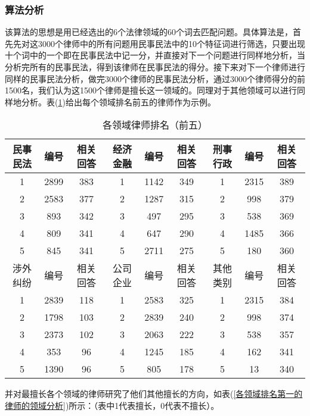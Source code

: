\documentclass[bwprint]{cumcmthesis}
\begin{document}
\subsubsection{算法分析}
该算法的思想是用已经选出的6个法律领域的60个词去匹配问题。具体算法是，首先先对这3000个律师中的所有问题用民事民法中的10个特征词进行筛选，只要出现十个词中的一个即在民事民法中记一分，并直接对下一个问题进行同样地分析，当分析完所有的民事民法，得到该律师在民事民法的得分。接下来对下一个律师进行同样的民事民法分析，做完3000个律师的民事民法分析，通过3000个律师得分的前1500名，我们认为这1500个律师是擅长这一领域的。同理对于其他领域可以进行同样地分析。表(\ref{各领域律师排名（前五）})给出每个领域排名前五的律师作为示例。

\begin{table}[!htp]
\center
\caption{各领域律师排名（前五）}
\label{各领域律师排名（前五）}
    \begin{tabular}{|c|c|c|c|c|c|c|c|c|}
    \hline
    民事民法 & 编号   & 相关回答 & 经济金融 & 编号   & 相关回答 & 刑事行政 & 编号   & 相关回答 \\ \hline
    1    & 2899 & 383   & 1    & 1142 & 349   & 1    & 2315 & 389   \\ \hline
    2    & 2583 & 377   & 2    & 1287 & 315   & 2    & 998  & 379   \\ \hline
    3    & 893  & 342   & 3    & 497  & 295   & 3    & 538  & 369   \\ \hline
    4    & 809  & 341   & 4    & 647  & 290   & 4    & 1485 & 366   \\ \hline
    5    & 845  & 341   & 5    & 2711 & 275   & 5    & 180  & 360   \\ \hline
    涉外纠纷 & 编号   & 相关回答 & 公司企业 & 编号   & 相关回答 & 其他类别 & 编号   & 相关回答 \\ \hline
    1    & 2839 & 118   & 1    & 2583 & 325   & 1    & 2315 & 384   \\ \hline
    2    & 1798 & 103   & 2    & 2839 & 240   & 2    & 998  & 374   \\ \hline
    3    & 2373 & 102   & 3    & 2063 & 222   & 3    & 538  & 357   \\ \hline
    4    & 353  & 96    & 4    & 1245 & 185   & 4    & 162  & 341   \\ \hline
    5    & 1390 & 96    & 5    & 805  & 178   & 5    & 13   & 340   \\ \hline
    \end{tabular}
\end{table}

并对最擅长各个领域的律师研究了他们其他擅长的方向，如表(\ref{各领域排名第一的律师的领域分析})所示：（表中1代表擅长，0代表不擅长）。
\end{document}
